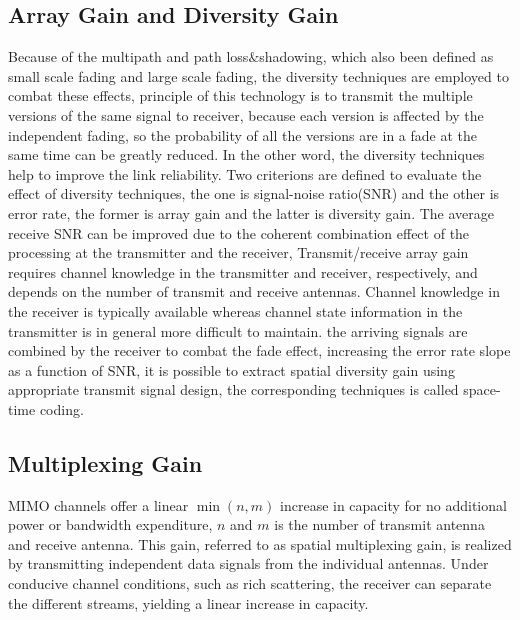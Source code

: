 \documentclass[conference]{IEEEtran}
\begin{document}
\subsection{Array Gain and Diversity Gain}
Because of the multipath and path loss$\&$shadowing, which also been defined as small scale fading and large scale fading, the diversity techniques are employed to combat these effects, principle of this technology is to transmit the multiple versions of the same signal to receiver, because each version is affected by the independent fading, so the probability of all the versions are in a fade at the same time can be greatly reduced. In the other word, the diversity techniques help to improve the link reliability. Two criterions are defined to evaluate the effect of diversity techniques, the one is signal-noise ratio(SNR) and the other is error rate, the former is array gain and the latter is diversity gain.\newline   
The average receive SNR can be improved due to the coherent combination effect of the processing at the transmitter and the receiver, Transmit/receive array gain requires channel knowledge in the transmitter and receiver, respectively, and depends on the number of transmit and receive antennas. Channel knowledge in the receiver is typically available whereas channel state information in the transmitter is in general more difficult to maintain.\newline
the arriving signals are combined by the receiver to combat the fade effect, increasing the error rate slope as a function of SNR, it is possible to extract spatial diversity gain using appropriate transmit signal design, the corresponding techniques is called space-time coding\cite{4}.\newline
\subsection{Multiplexing Gain}
MIMO channels offer a linear $\min(n,m)$ increase in capacity for no additional power or bandwidth expenditure, $n$ and $m$ is the number of transmit antenna and receive antenna. This gain, referred to as spatial multiplexing gain, is
realized by transmitting independent data signals from the individual antennas. Under conducive channel conditions, such as rich scattering, the receiver can separate the different streams, yielding a linear increase in capacity.\newline
\end{document}
